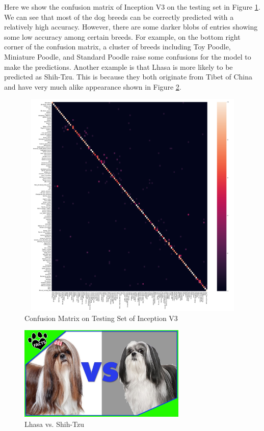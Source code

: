 \documentclass{article}
\begin{document}
Here we show the confusion matrix of Inception V3 on the testing set in Figure \ref{fig:cm}. We can see that most of the dog breeds can be correctly predicted with a relatively high accuracy. However, there are some darker blobs of entries showing some low accuracy among certain breeds. For example, on the bottom right corner of the confusion matrix, a cluster of breeds including Toy Poodle, Miniature Poodle, and Standard Poodle raise some confusions for the model to make the predictions. Another example is that Lhasa is more likely to be predicted as Shih-Tzu. This is because they both originate from Tibet of China and have very much alike appearance shown in Figure \ref{fig:lhasa_vs_shig}. 
\begin{figure}[h!]
    \centering
    \includegraphics[width=13cm,height=11cm]{confusion_matrix_inception.png}
    \caption{Confusion Matrix on Testing Set of Inception V3}
    \label{fig:cm}
\end{figure}

\begin{figure}[h!]
    \centering
    \includegraphics[width=8cm]{lhasa_vs_shih.jpg}
    \caption{Lhasa vs. Shih-Tzu}
    \label{fig:lhasa_vs_shig}
\end{figure}
\end{document}
